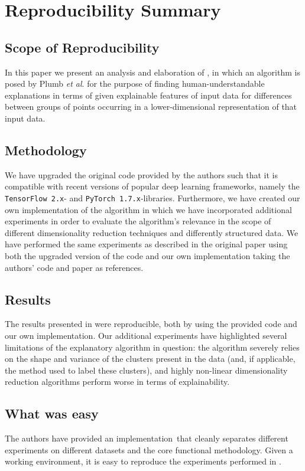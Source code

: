\section*{\centering Reproducibility Summary}

\subsection*{Scope of Reproducibility}
In this paper we present an analysis and elaboration of \cite{plumb2020explaining}, in which an algorithm is posed by Plumb \textit{et al}. for the purpose of finding human-understandable explanations in terms of given explainable features of input data for differences between groups of points occurring in a lower-dimensional representation of that input data.

\subsection*{Methodology}
We have upgraded the original code provided by the authors such that it is compatible with recent versions of popular deep learning frameworks, namely the \texttt{TensorFlow 2.x}- and \texttt{PyTorch 1.7.x}-libraries. Furthermore, we have created our own implementation of the algorithm in which we have incorporated additional experiments in order to evaluate the algorithm's relevance in the scope of different dimensionality reduction techniques and differently structured data. We have performed the same experiments as described in the original paper using both the upgraded version of the code and our own implementation taking the authors' code and paper as references.

\subsection*{Results}
The results presented in \cite{plumb2020explaining} were reproducible, both by using the provided code and our own implementation. Our additional experiments have highlighted several limitations of the explanatory algorithm in question: the algorithm severely relies on the shape and variance of the clusters present in the data (and, if applicable, the method used to label these clusters), and highly non-linear dimensionality reduction algorithms perform worse in terms of explainability.

\subsection*{What was easy}
The authors have provided an implementation\footnotemark~that cleanly separates different experiments on different datasets and the core functional methodology. Given a working environment, it is easy to reproduce the experiments performed in \cite{plumb2020explaining}.


